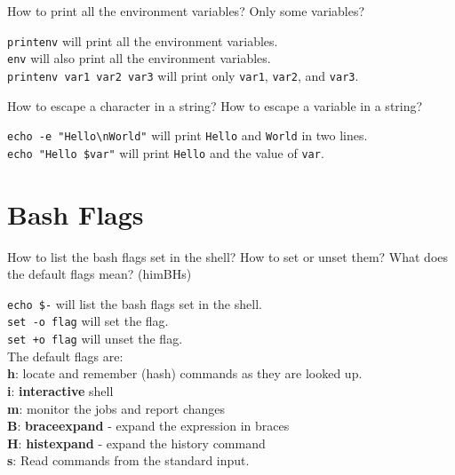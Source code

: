 \begin{qs}
  How to print all the environment variables? Only some variables?
\end{qs}

\begin{ans}
  \texttt{printenv} will print all the environment variables. \\
  \texttt{env} will also print all the environment variables. \\
  \texttt{printenv var1 var2 var3} will print only \texttt{var1}, \texttt{var2}, and \texttt{var3}.
\end{ans}

\begin{qs}
  How to escape a character in a string? How to escape a variable in a string?
\end{qs}

\begin{ans}
  \texttt{echo -e "Hello\textbackslash nWorld"} will print \texttt{Hello} and \texttt{World} in two lines. \\
  \texttt{echo "Hello \$var"} will print \texttt{Hello} and the value of \texttt{var}.
\end{ans}

\section{Bash Flags}

\begin{qs}
  How to list the bash flags set in the shell? How to set or unset them?
  What does the default flags mean? (himBHs)
\end{qs}

\begin{ans}
  \texttt{echo \$-} will list the bash flags set in the shell. \\
  \texttt{set -o flag} will set the flag. \\
  \texttt{set +o flag} will unset the flag. \\
  The default flags are: \\
  \textbf{h}: locate and remember (hash) commands as they are looked up. \\
  \textbf{i}: \textbf{interactive} shell \\
  \textbf{m}: monitor the jobs and report changes \\
  \textbf{B}: \textbf{braceexpand} - expand the expression in braces \\
  \textbf{H}: \textbf{histexpand} - expand the history command \\
  \textbf{s}: Read commands from the standard input. \\
\end{ans}

